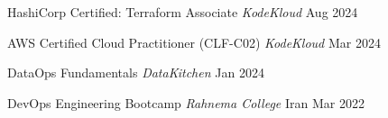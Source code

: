 
\begin{cvhonors}

  \cvhonor
    {HashiCorp Certified: Terraform Associate}
    {\textit{KodeKloud}}
    {}
    {Aug 2024}

  \cvhonor
    {AWS Certified Cloud Practitioner (CLF-C02)}
    {\textit{KodeKloud}}
    {}
    {Mar 2024}

  \cvhonor
    {DataOps Fundamentals}
    {\textit{DataKitchen}}
    {}
    {Jan 2024}

  \cvhonor
    {DevOps Engineering Bootcamp}
    {\textit{Rahnema College}}
    {Iran}
    {Mar 2022}

\end{cvhonors}
